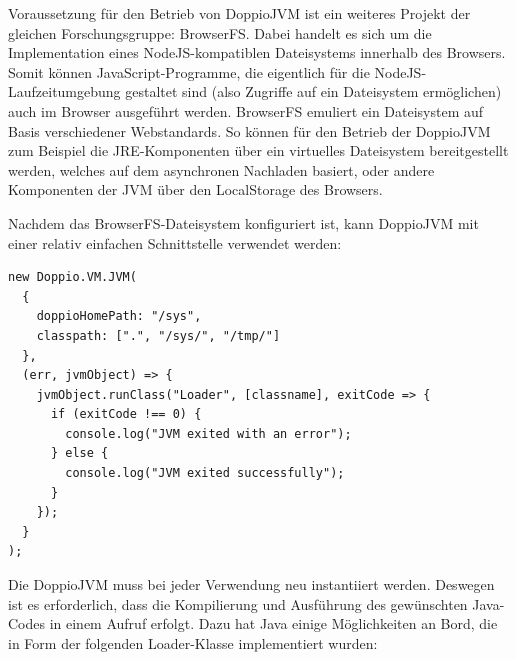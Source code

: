Voraussetzung für den Betrieb von DoppioJVM ist ein weiteres Projekt der gleichen Forschungsgruppe: BrowserFS. Dabei handelt es sich um die Implementation eines NodeJS-kompatiblen Dateisystems innerhalb des Browsers. Somit können JavaScript-Programme, die eigentlich für die NodeJS-Laufzeitumgebung gestaltet sind (also Zugriffe auf ein Dateisystem ermöglichen) auch im Browser ausgeführt werden. BrowserFS emuliert ein Dateisystem auf Basis verschiedener Webstandards. So können für den Betrieb der DoppioJVM zum Beispiel die JRE-Komponenten über ein virtuelles Dateisystem bereitgestellt werden, welches auf dem asynchronen Nachladen basiert, oder andere Komponenten der JVM über den LocalStorage des Browsers.

Nachdem das BrowserFS-Dateisystem konfiguriert ist, kann DoppioJVM mit einer relativ einfachen Schnittstelle verwendet werden:

\begin{minipage}{\linewidth}
\begin{lstlisting}
new Doppio.VM.JVM(
  {
    doppioHomePath: "/sys",
    classpath: [".", "/sys/", "/tmp/"]
  },
  (err, jvmObject) => {
    jvmObject.runClass("Loader", [classname], exitCode => {
      if (exitCode !== 0) {
        console.log("JVM exited with an error");
      } else {
        console.log("JVM exited successfully");
      }
    });
  }
);
\end{lstlisting}
\end{minipage}

Die DoppioJVM muss bei jeder Verwendung neu instantiiert werden. Deswegen ist es erforderlich, dass die Kompilierung und Ausführung des gewünschten Java-Codes in einem Aufruf erfolgt. Dazu hat Java einige Möglichkeiten an Bord, die in Form der folgenden Loader-Klasse implementiert wurden:

